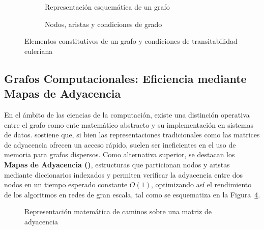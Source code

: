 \begin{figure}[H]
    \centering
    \begin{subfigure}[b]{0.47\textwidth}
        \centering
        \caption{Representación esquemática de un grafo}
        \label{fig:DiagramaAristas1}
    \end{subfigure}
    \hfill
    \begin{subfigure}[b]{0.47\textwidth}
        \centering
        \caption{Nodos, aristas y condiciones de grado}
        \label{fig:DiagramaAristas2}
    \end{subfigure}
    \caption{Elementos constitutivos de un grafo y condiciones de transitabilidad euleriana}
    \label{fig:diagramas-aristas}
\end{figure}

\subsection{Grafos Computacionales: Eficiencia mediante Mapas de Adyacencia}
\label{subsec:grafos-computacionales}
    En el ámbito de las ciencias de la computación, existe una distinción operativa entre el grafo como ente
    matemático abstracto y su implementación en sistemas de datos. \textcite{valiente2022} sostiene que, si bien
    las representaciones tradicionales como las matrices de adyacencia ofrecen un acceso rápido, suelen ser
    ineficientes en el uso de memoria para grafos dispersos. Como alternativa superior, se destacan los
    \textbf{Mapas de Adyacencia ()}, estructuras que particionan nodos y aristas mediante
    diccionarios indexados y permiten verificar la adyacencia entre dos nodos en un tiempo esperado constante
    $O(1)$, optimizando así el rendimiento de los algoritmos en redes de gran escala, tal como se esquematiza en
    la Figura~\ref{fig:PresentacionCaminos}.

\begin{figure}[H]
    \centering
    \caption{Representación matemática de caminos sobre una matriz de adyacencia}
    \label{fig:PresentacionCaminos}
\end{figure}

